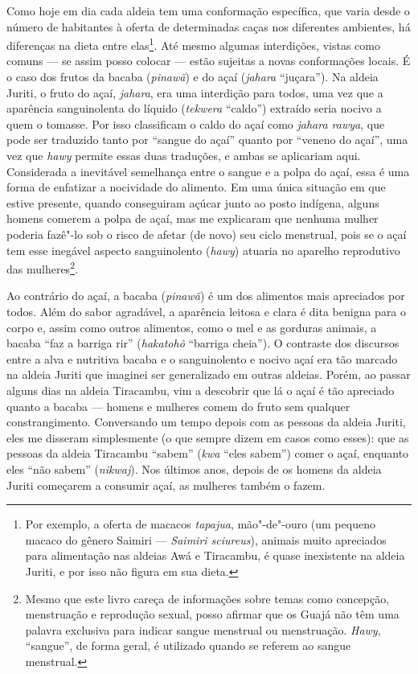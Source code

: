 Como hoje em dia cada aldeia tem uma conformação específica, que varia
desde o número de habitantes à oferta de determinadas caças nos
diferentes ambientes, há diferenças na dieta entre elas\footnote{Por
  exemplo, a oferta de macacos \emph{tapajua}, mão"-de"-ouro (um pequeno
  macaco do gênero Saimiri --- \emph{Saimiri sciureus}), animais muito
  apreciados para alimentação nas aldeias Awá e Tiracambu,
  é quase inexistente na aldeia Juriti, e por isso não figura em sua
  dieta.}. Até mesmo algumas interdições, vistas como comuns --- se assim
posso colocar --- estão sujeitas a novas conformações locais. É o caso dos
frutos da bacaba (\emph{pinawã}) e do açaí (\emph{jahara} ``juçara''). Na
aldeia Juriti, o fruto do açaí, \emph{jahara}, era uma interdição para
todos, uma vez que a aparência sanguinolenta do líquido (\emph{tekwera}
``caldo'') extraído seria nocivo a quem o tomasse. Por isso classificam o
caldo do açaí como \emph{jahara rawya}, que pode ser traduzido tanto por
``sangue do açaí'' quanto por ``veneno do açaí'', uma vez que \emph{hawy}
permite essas duas traduções, e ambas se aplicariam aqui. Considerada a
inevitável semelhança entre o sangue e a polpa do açaí, essa é uma forma
de enfatizar a nocividade do alimento. Em uma única situação em que
estive presente, quando conseguiram açúcar junto ao posto indígena,
alguns homens comerem a polpa de açaí, mas me explicaram que nenhuma
mulher poderia fazê"-lo sob o risco de afetar (de novo) seu ciclo
menstrual, pois se o açaí tem esse inegável aspecto sanguinolento
(\emph{hawy}) atuaria no aparelho reprodutivo das mulheres\footnote{Mesmo
  que este livro careça de informações sobre temas como concepção,
  menstruação e reprodução sexual, posso afirmar que os Guajá não têm
  uma palavra exclusiva para indicar sangue menstrual ou menstruação.
  \emph{Hawy}, ``sangue'', de forma geral, é utilizado quando se referem
  ao sangue menstrual.}.

Ao contrário do açaí, a bacaba (\emph{pinawã}) é um dos alimentos mais
apreciados por todos. Além do sabor agradável, a aparência leitosa e
clara é dita benigna para o corpo e, assim como outros alimentos, como o
mel e as gorduras animais, a bacaba ``faz a barriga rir'' (\emph{hakatohõ}
``barriga cheia''). O contraste dos discursos entre a alva e nutritiva
bacaba e o sanguinolento e nocivo açaí era tão marcado na aldeia Juriti
que imaginei ser generalizado em outras aldeias. Porém, ao passar alguns
dias na aldeia Tiracambu, vim a descobrir que lá o açaí é tão apreciado
quanto a bacaba --- homens e mulheres comem do fruto sem qualquer
constrangimento. Conversando um tempo depois com as pessoas da aldeia
Juriti, eles me disseram simplesmente (o que sempre dizem em casos como
esses): que as pessoas da aldeia Tiracambu ``sabem'' (\emph{kwa} ``eles
sabem'') comer o açaí, enquanto eles ``não sabem'' (\emph{nikwaj}). Nos
últimos anos, depois de os homens da aldeia Juriti começarem a consumir
açaí, as mulheres também o fazem.


